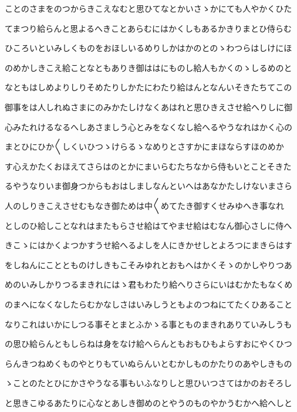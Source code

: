 \documentclass[a4paper,11pt,landscape]{ltjtarticle}
\begin{document}
ことのさまをのつからきこえなむと思ひてなとかいさゝかにても人やかくひた
\par\medskip
てまつり給らんと思よるへきことあらむにはかくしもあるかきりまとひ侍らむ
\par\medskip
ひころいといみしくものをおほしいるめりしかはかのとのゝわつらはしけにほ
\par\medskip
のめかしきこえ給ことなともありき御ははにものし給人もかくのゝしるめのと
\par\medskip
なともはしめよりしりそめたりしかたにわたり給はんとなんいそきたちてこの
\par\medskip
御事をは人しれぬさまにのみかたしけなくあはれと思ひきえさせ給へりしに御
\par\medskip
心みたれけるなるへしあさましう心とみをなくなし給へるやうなれはかく心の
\par\medskip
まとひにひか〱しくいひつゝけらるゝなめりとさすかにまほならすほのめか
\par\medskip
す心えかたくおほえてさらはのとかにまいらむたちなから侍もいとことそきた
\par\medskip
るやうなりいま御身つからもおはしましなんといへはあなかたしけないまさら
\par\medskip
人のしりきこえさせむもなき御ためは中〱めてたき御すくせみゆへき事なれ
\par\medskip
としのひ給しことなれはまたもらさせ給はてやませ給はむなん御心さしに侍へ
\par\medskip
きこゝにはかくよつかすうせ給へるよしを人にきかせしとよろつにまきらはす
\par\medskip
をしねんにこととものけしきもこそみゆれとおもへはかくそゝのかしやりつあ
\par\medskip
めのいみしかりつるまきれにはゝ君もわたり給へりさらにいはむかたもなくめ
\par\medskip
のまへになくなしたらむかなしさはいみしうともよのつねにてたくひあること
\par\medskip
なりこれはいかにしつる事そとまとふかゝる事とものまきれありていみしうも
\par\medskip
の思ひ給らんともしらねは身をなけ給へらんともおもひもよらすおにやくひつ
\par\medskip
らんきつねめくものやとりもていぬらんいとむかしものかたりのあやしきもの
\par\medskip
ゝことのたとひにかさやうなる事もいふなりしと思ひいつさてはかのおそろし
\par\medskip
と思きこゆるあたりに心なとあしき御めのとやうのものやかうむかへ給へしと
\par\medskip
\end{document}
